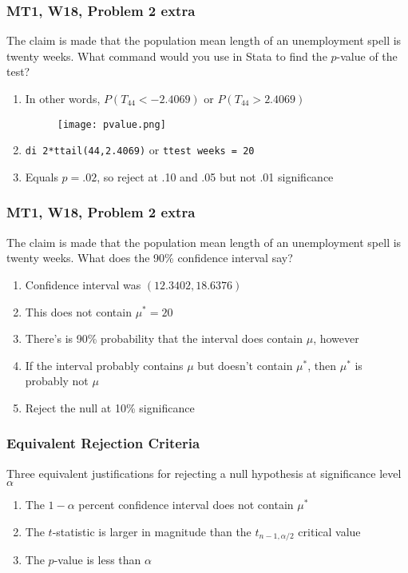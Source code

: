 \documentclass[handout, 9pt]{beamer}
\begin{document}
\begin{frame}
	\frametitle{MT1, W18, Problem 2 extra}
	The claim is made that the population mean length of an unemployment spell is twenty weeks. What command would you use in Stata to find the $p$-value of the test?
	
	\begin{enumerate}
		\item<1-> In other words, $P(T_{44} < -2.4069)$ or $P(T_{44} > 2.4069)$
		\begin{figure}[H]\centering
				\texttt{[image: pvalue.png]}
		\end{figure}
		\item<1-> \texttt{di 2*ttail(44,2.4069)} or \texttt{ttest weeks = 20}
		\item<2-> Equals $p=.02$, so reject at .10 and .05 but not .01 significance
	\end{enumerate}
\end{frame}




\begin{frame}
	\frametitle{MT1, W18, Problem 2 extra}
	The claim is made that the population mean length of an unemployment spell is twenty weeks. What does the 90\% confidence interval say?
	
	\begin{enumerate}
		\item<1-> Confidence interval was $\left(12.3402, 18.6376\right)$
		\item<2-> This does not contain $\mu^*=20$
		\item<3-> There's is 90\% probability that the interval does contain $\mu$, however
		\item<4-> If the interval probably contains $\mu$ but doesn't contain $\mu^*$, then $\mu^*$ is probably not $\mu$
		\item<5-> Reject the null at 10\% significance
	\end{enumerate}
\end{frame}





\begin{frame}
	\frametitle{Equivalent Rejection Criteria}
	Three equivalent justifications for rejecting a null hypothesis at significance level $\alpha$	
	\begin{enumerate}
		\item<2-> The $1-\alpha$ percent confidence interval does not contain $\mu^*$
		\item<3-> The $t$-statistic is larger in magnitude than the $t_{n-1, \alpha/2}$ critical value
		\item<4-> The $p$-value is less than $\alpha$
	\end{enumerate}
\end{frame}
\end{document}
